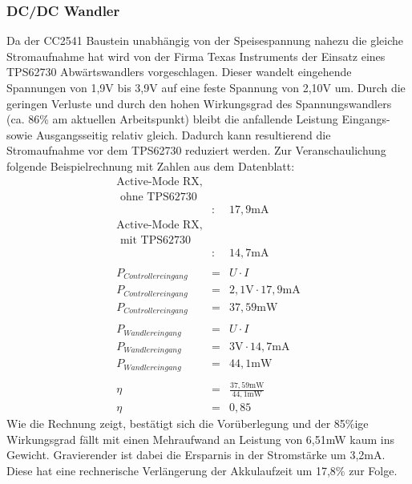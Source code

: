 \documentclass[12pt]{scrreprt} %
\begin{document}
\subsubsection{DC/DC Wandler}
Da der CC2541 Baustein unabhängig von der Speisespannung nahezu die gleiche Stromaufnahme hat \citep[vgl. S. 21]{CC2541} wird von der Firma Texas Instruments der Einsatz eines TPS62730 Abwärtswandlers vorgeschlagen. Dieser wandelt eingehende Spannungen von 1,9V bis 3,9V auf eine feste Spannung von 2,10V um.  Durch die geringen Verluste und durch den hohen Wirkungsgrad des Spannungswandlers (ca. 86\% am aktuellen Arbeitspunkt) bleibt die anfallende Leistung Eingangs- sowie Ausgangsseitig relativ gleich. Dadurch kann resultierend die Stromaufnahme vor dem TPS62730 reduziert werden. Zur Veranschaulichung folgende Beispielrechnung mit Zahlen aus dem Datenblatt:
\begin{eqnarray}
\text{Active-Mode RX,}&&\nonumber\\
\text{ ohne TPS62730}&&\nonumber\\
&:&17,9\text{mA}\nonumber\\
\text{Active-Mode RX,}&&\nonumber\\
\text{ mit TPS62730}&&\nonumber\\
&:&14,7\text{mA}\nonumber\\
\nonumber\\
P_{Controllereingang}&=&U \cdot I\\
P_{Controllereingang}&=&2,1\text{V} \cdot 17,9 \text{mA}\\
P_{Controllereingang}&=&37,59 \text{mW}\\
\nonumber\\
P_{Wandlereingang}&=& U \cdot I\\
P_{Wandlereingang}&=&3\text{V} \cdot 14,7 \text{mA}\\
P_{Wandlereingang}&=&44,1 \text{mW}\\
\nonumber\\
\eta&=&\frac{37,59\text{mW}}{44,1\text{mW}}\\
\eta&=&0,85
\end{eqnarray}
Wie die Rechnung zeigt, bestätigt sich die Vorüberlegung und der 85\%ige Wirkungsgrad fällt mit einen Mehraufwand an Leistung von 6,51mW kaum ins Gewicht. Gravierender ist dabei die Ersparnis in der Stromstärke um 3,2mA. Diese hat eine rechnerische Verlängerung der Akkulaufzeit um 17,8\% zur Folge.
\end{document}
